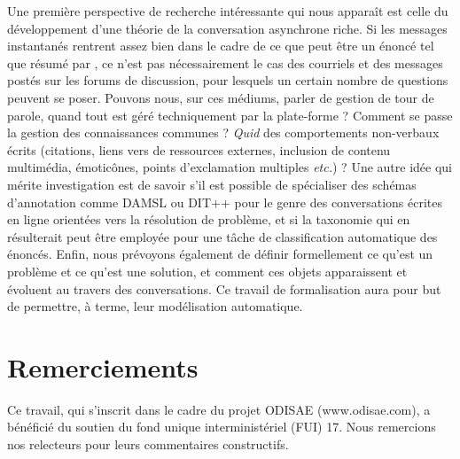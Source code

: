 \documentclass[10pt,a4paper,twoside]{article}
\begin{document}
Une première perspective de recherche intéressante qui nous apparaît est celle du développement d'une théorie de la conversation asynchrone riche. Si les messages instantanés rentrent assez bien dans le cadre de ce que peut être un énoncé tel que résumé par \citet{popescu2005dialogue}, ce n'est pas nécessairement le cas des courriels et des messages postés sur les forums de discussion, pour lesquels un certain nombre de questions peuvent se poser. Pouvons nous, sur ces médiums, parler de gestion de tour de parole, quand tout est géré techniquement par la plate-forme ? Comment se passe la gestion des connaissances communes ? \textit{Quid} des comportements non-verbaux écrits (citations, liens vers de ressources externes, inclusion de contenu multimédia, émoticônes, points d'exclamation multiples \textit{etc.}) ? Une autre idée qui mérite investigation est de savoir s'il est possible de spécialiser des schémas d'annotation comme DAMSL ou DIT++ pour le genre des conversations écrites en ligne orientées vers la résolution de problème, et si la taxonomie qui en résulterait peut être employée pour une tâche de classification automatique des énoncés. Enfin, nous prévoyons également de définir formellement ce qu'est un problème et ce qu'est une solution, et comment ces objets apparaissent et évoluent au travers des conversations. Ce travail de formalisation aura pour but de permettre, à terme, leur modélisation automatique.

\section*{Remerciements}
Ce travail, qui s’inscrit dans le cadre du projet ODISAE (www.odisae.com), a bénéficié du soutien du fond unique interministériel (FUI) 17. Nous remercions nos relecteurs pour leurs commentaires constructifs.




\end{document}
